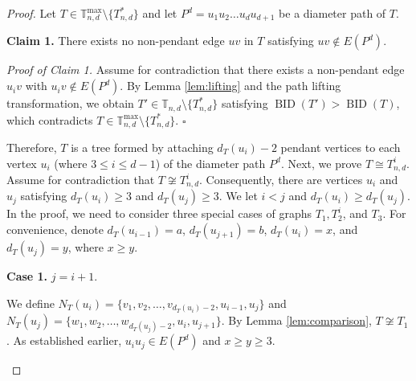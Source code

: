\documentclass[12pt]{article}
\theoremstyle{definition}
\newcommand{\BID}{\operatorname{BID}}
\newcommand{\TT}{\mathbb{T}}
\begin{document}
\begin{proof}
Let \(T \in \TT_{n,d}^{\max}\setminus\{T_{n,d}^*\}\) and let \(P^d = u_1u_2\ldots u_d u_{d+1}\) be a diameter path of \(T\).

\textbf{Claim 1.} There exists no non-pendant edge \(uv\) in \(T\) satisfying \(uv \notin E(P^d)\).

\textit{Proof of Claim 1.} Assume for contradiction that there exists a non-pendant edge \(u_i v\) with \(u_i v \notin E(P^d)\). By Lemma \ref{lem:lifting} and the path lifting transformation, we obtain \(T' \in \TT_{n,d}\setminus\{T_{n,d}^*\}\) satisfying \(\BID(T') > \BID(T)\), which contradicts \(T \in \TT_{n,d}^{\max}\setminus\{T_{n,d}^*\}\). $\square$

Therefore, \(T\) is a tree formed by attaching \(d_T(u_i) - 2\) pendant vertices to each vertex \(u_i\) (where \(3 \leq i \leq d-1\)) of the diameter path \(P^d\). Next, we prove \(T \cong T_{n,d}^i\). Assume for contradiction that \(T \not\cong T_{n,d}^i\). Consequently, there are vertices \(u_i\) and \(u_j\) satisfying \(d_T(u_i) \geq 3\) and \(d_T(u_j) \geq 3\). We let \(i < j\) and \(d_T(u_i) \geq d_T(u_j)\). In the proof, we need to consider three special cases of graphs \(T_1, T_2^i\), and \(T_3\). For convenience, denote \(d_T(u_{i-1}) = a\), \(d_T(u_{j+1}) = b\), \(d_T(u_i) = x\), and \(d_T(u_j) = y\), where \(x \geq y\).

\textbf{Case 1.} \(j = i+1\).

We define \(N_T(u_i) = \{v_1, v_2, \ldots, v_{d_T(u_i)-2}, u_{i-1}, u_j\}\) and \(N_T(u_j) = \{w_1, w_2, \ldots, w_{d_T(u_j)-2}, u_i, u_{j+1}\}\). By Lemma \ref{lem:comparison}, \(T \not\cong T_1\). As established earlier, \(u_i u_j \in E(P^d)\) and \(x \geq y \geq 3\).

\begin{figure}[h]
\centering
{}
\end{figure}
\end{proof}
\end{document}
